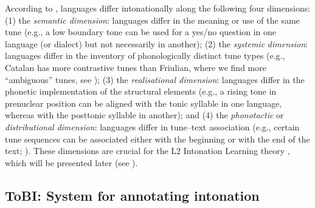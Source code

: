 According to \citet{Ladd1996, Ladd2008}, languages differ intonationally along the following four dimensions: (1) the \textit{semantic dimension}: languages differ in the meaning or use of the same tune (e.g., a low boundary tone can be used for a yes/no question in one language (or dialect) but not necessarily in another); (2) the \textit{systemic} \textit{dimension}: languages differ in the inventory of phonologically distinct tune types (e.g., Catalan has more contrastive tunes than Friulian, where we find more “ambiguous” tunes, see \citealt{RoseanoEtAl2015}); (3) the \textit{realisational dimension}: languages differ in the phonetic implementation of the structural elements (e.g., a rising tone in prenuclear position can be aligned with the tonic syllable in one language, whereas with the posttonic syllable in another); and (4) the \textit{phonotactic} or \textit{distributional} \textit{dimension}: languages differ in tune–text association (e.g., certain tune sequences can be associated either with the beginning or with the end of the text; \citealt[116--118]{Ladd2008}). These dimensions are crucial for the L2 Intonation Learning theory \citep{Mennen2015}, which will be presented later (see ).


\subsection{ToBI: System for annotating intonation}\label{sec:2.2.2} %

